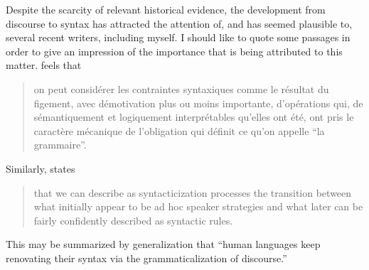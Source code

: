 Despite the scarcity of relevant historical evidence, the development from discourse to syntax has attracted the attention of, and has seemed plausible to, several recent writers, including myself. I should like to quote some passages in order to give an impression of the importance that is being attributed to this matter. \citet[22]{Hagège1978} feels that

\begin{quote} \label{Hagege}
on peut considérer les contraintes syntaxiques comme le résultat du figement, avec démotivation plus ou moins importante, d'opérations qui, de sémantiquement et logiquement interprétables qu'elles ont été, ont pris le caractère mécanique de l'obligation qui définit ce qu'on appelle ``la grammaire''.
\end{quote}

\noindent Similarly, \citet[62]{Sankoff1977} states

\begin{quote}
that we can describe as syntacticization processes the transition between what initially appear to be ad hoc speaker strategies and what later can be fairly confidently described as syntactic rules.
\end{quote}

\noindent This may be summarized by  generalization that “human languages keep renovating their syntax via the grammaticalization of discourse.”

